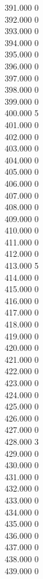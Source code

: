 { 391.000	0 \\
 392.000	0 \\
 393.000	0 \\
 394.000	0 \\
 395.000	0 \\
 396.000	0 \\
 397.000	0 \\
 398.000	0 \\
 399.000	0 \\
 400.000	5 \\
 401.000	0 \\
 402.000	0 \\
 403.000	0 \\
 404.000	0 \\
 405.000	0 \\
 406.000	0 \\
 407.000	0 \\
 408.000	0 \\
 409.000	0 \\
 410.000	0 \\
 411.000	0 \\
 412.000	0 \\
 413.000	5 \\
 414.000	0 \\
 415.000	0 \\
 416.000	0 \\
 417.000	0 \\
 418.000	0 \\
 419.000	0 \\
 420.000	0 \\
 421.000	0 \\
 422.000	0 \\
 423.000	0 \\
 424.000	0 \\
 425.000	0 \\
 426.000	0 \\
 427.000	0 \\
 428.000	3 \\
 429.000	0 \\
 430.000	0 \\
 431.000	0 \\
 432.000	0 \\
 433.000	0 \\
 434.000	0 \\
 435.000	0 \\
 436.000	0 \\
 437.000	0 \\
 438.000	0 \\
 439.000	0 \\
}

